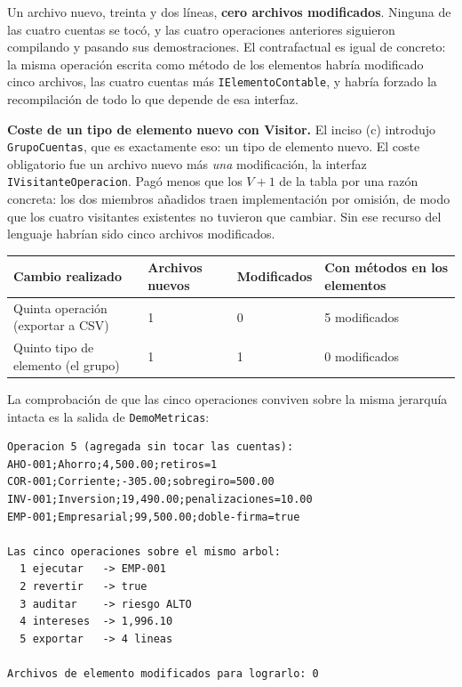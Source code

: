 Un archivo nuevo, treinta y dos líneas, \textbf{cero archivos modificados}. Ninguna de las cuatro
cuentas se tocó, y las cuatro operaciones anteriores siguieron compilando y pasando sus
demostraciones. El contrafactual es igual de concreto: la misma operación escrita como método
de los elementos habría modificado cinco archivos, las cuatro cuentas más
\texttt{IElementoContable}, y habría forzado la recompilación de todo lo que depende de esa
interfaz.

\textbf{Coste de un tipo de elemento nuevo con Visitor.} El inciso (c) introdujo
\texttt{GrupoCuentas}, que es exactamente eso: un tipo de elemento nuevo. El coste obligatorio
fue un archivo nuevo más \emph{una} modificación, la interfaz \texttt{IVisitanteOperacion}.
Pagó menos que los $V+1$ de la tabla por una razón concreta: los dos miembros añadidos
traen implementación por omisión, de modo que los cuatro visitantes existentes no tuvieron
que cambiar. Sin ese recurso del lenguaje habrían sido cinco archivos modificados.

\begin{table}[h!]
    \centering
    \small
    \begin{tabular}{p{5.6cm}p{2.5cm}p{2.5cm}p{3.0cm}}
        \toprule
        \textbf{Cambio realizado} & \textbf{Archivos nuevos} & \textbf{Modificados}
        & \textbf{Con métodos en los elementos} \\
        \midrule
        Quinta operación (exportar a CSV) & 1 & 0 & 5 modificados \\
        \addlinespace
        Quinto tipo de elemento (el grupo) & 1 & 1 & 0 modificados \\
        \bottomrule
    \end{tabular}
\end{table}

La comprobación de que las cinco operaciones conviven sobre la misma jerarquía intacta es la
salida de \texttt{DemoMetricas}:

{\small
\begin{verbatim}
Operacion 5 (agregada sin tocar las cuentas):
AHO-001;Ahorro;4,500.00;retiros=1
COR-001;Corriente;-305.00;sobregiro=500.00
INV-001;Inversion;19,490.00;penalizaciones=10.00
EMP-001;Empresarial;99,500.00;doble-firma=true

Las cinco operaciones sobre el mismo arbol:
  1 ejecutar   -> EMP-001
  2 revertir   -> true
  3 auditar    -> riesgo ALTO
  4 intereses  -> 1,996.10
  5 exportar   -> 4 lineas

Archivos de elemento modificados para lograrlo: 0
\end{verbatim}
}


